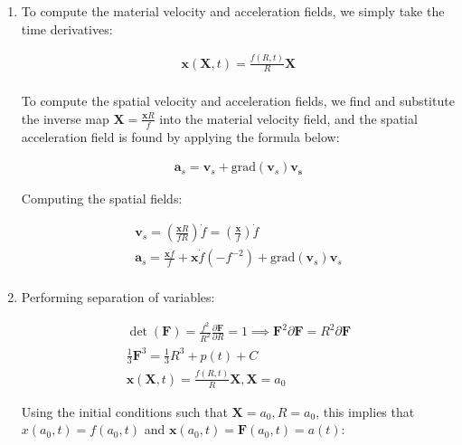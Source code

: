 \begin{problem}
\begin{enumerate}
\begin{enumerate}
    \end{enumerate}
    \item To compute the material velocity and acceleration fields, we simply take the time derivatives:
    
    \begin{align}
    \mathbf{x}(\mathbf{X},t)=\frac{f(R,t)}{R}\mathbf{X} \\
    \end{align}
    
    
    To compute the spatial velocity and acceleration fields, we find and substitute the inverse map $\mathbf{X}=\frac{\mathbf{x}R}{f}$ into the material velocity field, and the spatial acceleration field is found by applying the formula below:
    
    
    \begin{align}
    \mathbf{a}_{s}=\mathbf{v}_{s}+\text{grad}(\mathbf{v}_{s})\mathbf{v_{s}}
    \end{align}
    
    Computing the spatial fields:
    
    \begin{align}
    \mathbf{v}_{s}=\left( \frac{\mathbf{x}R}{fR} \right)\dot{f}=\left( \frac{\mathbf{x}}{f} \right)\dot{f} \\
    \mathbf{a}_{s}=\frac{\mathbf{x}\ddot{f}}{f}+\mathbf{x}\dot{f}(-f^{-2})+\text{grad}(\mathbf{v}_{s})\mathbf{v}_{s} \\
    \end{align}
    \item Performing separation of variables:
    
    \begin{align}
    \det(\mathbf{F})=\frac{f^2}{R^2}\frac{ \partial \mathbf{F} }{ \partial R } =1\implies \mathbf{F}^2\partial \mathbf{F}=R^2\partial \mathbf{F} \\
    \frac{1}{3}\mathbf{F}^3=\frac{1}{3}R^3+p(t)+C \\
    \mathbf{x}(\mathbf{X},t)=\frac{f(R,t)}{R}\mathbf{X}, \mathbf{X}=a_{0}
    \end{align}
    
    
    Using the initial conditions such that $\mathbf{X}=a_{0}, R=a_{0}$, this implies that $x(a_{0},t)=f(a_{0}, t)$ and $\mathbf{x}(a_{0}, t)=\mathbf{F}(a_{0},t)=a(t)$:
    

\end{enumerate}
\end{problem}
